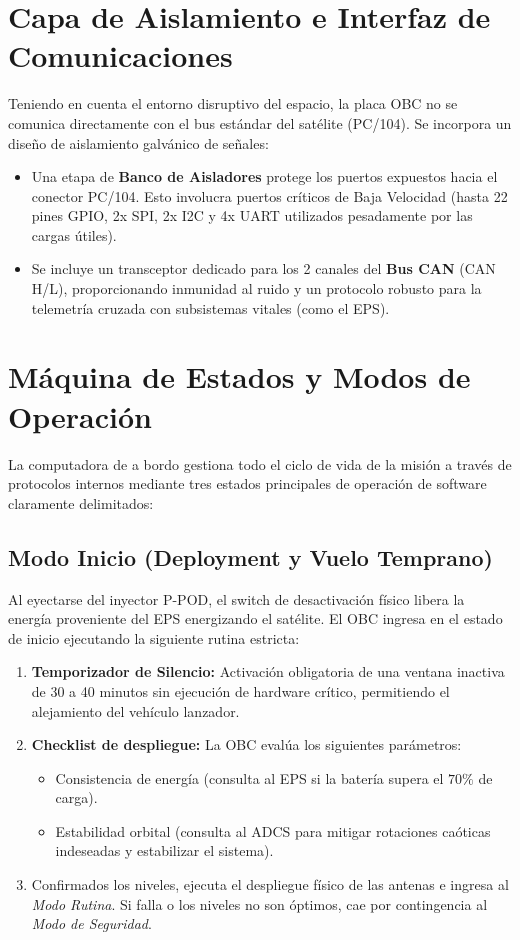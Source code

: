 \section{Capa de Aislamiento e Interfaz de Comunicaciones}
Teniendo en cuenta el entorno disruptivo del espacio, la placa OBC no se comunica directamente con el bus estándar del satélite (PC/104). Se incorpora un diseño de aislamiento galvánico de señales:
\begin{itemize}
    \item Una etapa de \textbf{Banco de Aisladores} protege los puertos expuestos hacia el conector PC/104. Esto involucra puertos críticos de Baja Velocidad (hasta 22 pines GPIO, 2x SPI, 2x I2C y 4x UART utilizados pesadamente por las cargas útiles).
    \item Se incluye un transceptor dedicado para los 2 canales del \textbf{Bus CAN} (CAN H/L), proporcionando inmunidad al ruido y un protocolo robusto para la telemetría cruzada con subsistemas vitales (como el EPS).
\end{itemize}

\section{Máquina de Estados y Modos de Operación}
La computadora de a bordo gestiona todo el ciclo de vida de la misión a través de protocolos internos mediante tres estados principales de operación de software claramente delimitados:

\subsection{Modo Inicio (Deployment y Vuelo Temprano)}
Al eyectarse del inyector P-POD, el switch de desactivación físico libera la energía proveniente del EPS energizando el satélite. El OBC ingresa en el estado de inicio ejecutando la siguiente rutina estricta:
\begin{enumerate}
    \item \textbf{Temporizador de Silencio:} Activación obligatoria de una ventana inactiva de 30 a 40 minutos sin ejecución de hardware crítico, permitiendo el alejamiento del vehículo lanzador.
    \item \textbf{Checklist de despliegue:} La OBC evalúa los siguientes parámetros:
    \begin{itemize}
        \item Consistencia de energía (consulta al EPS si la batería supera el $70\%$ de carga).
        \item Estabilidad orbital (consulta al ADCS para mitigar rotaciones caóticas indeseadas y estabilizar el sistema).
    \end{itemize}
    \item Confirmados los niveles, ejecuta el despliegue físico de las antenas e ingresa al \textit{Modo Rutina}. Si falla o los niveles no son óptimos, cae por contingencia al \textit{Modo de Seguridad}.
\end{enumerate}

